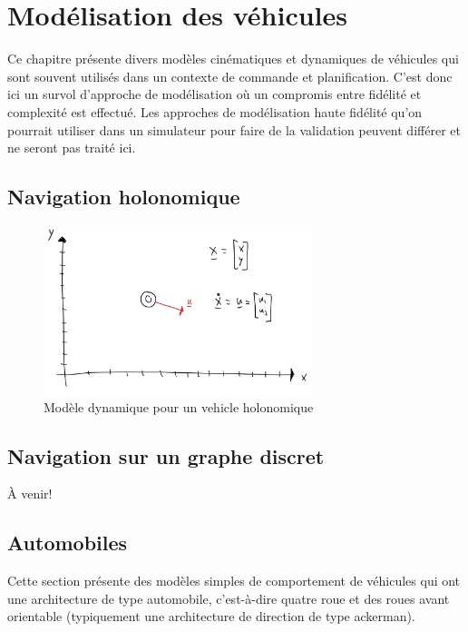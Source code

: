 \chapter{Modélisation des véhicules}

Ce chapitre présente divers modèles cinématiques et dynamiques de véhicules qui sont souvent utilisés dans un contexte de commande et planification. C'est donc ici un survol d'approche de modélisation où un compromis entre fidélité et complexité est effectué. Les approches de modélisation haute fidélité qu'on pourrait utiliser dans un simulateur pour faire de la validation peuvent différer et ne seront pas traité ici.


\section{Navigation holonomique}

\begin{figure}[htbp]
	\centering
		\includegraphics[width=0.70\textwidth]{fig/holonomicvehicle.jpg}
	\caption{Modèle dynamique pour un vehicle holonomique}
	\label{fig:holonomicvehicle}
\end{figure}


\section{Navigation sur un graphe discret}

À venir!



\section{Automobiles}

Cette section présente des modèles simples de comportement de véhicules qui ont une architecture de type automobile, c'est-à-dire quatre roue et des roues avant orientable (typiquement une architecture de direction de type ackerman).

